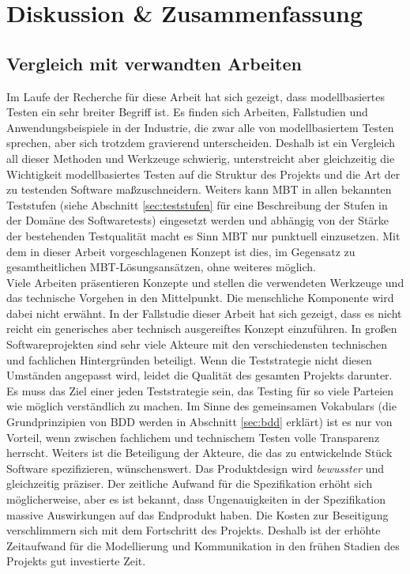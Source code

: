 \makeatletter\ifthesis@masterthesis
\chapter{Diskussion \& Zusammenfassung}
\label{sec:discussion}

\section{Vergleich mit verwandten Arbeiten}
Im Laufe der Recherche für diese Arbeit hat sich gezeigt, dass modellbasiertes Testen ein sehr breiter Begriff ist. Es finden sich Arbeiten, Fallstudien und Anwendungsbeispiele in der Industrie, die zwar alle von modellbasiertem Testen sprechen, aber sich trotzdem gravierend unterscheiden. Deshalb ist ein Vergleich all dieser Methoden und Werkzeuge schwierig, unterstreicht aber gleichzeitig die Wichtigkeit modellbasiertes Testen auf die Struktur des Projekts und die Art der zu testenden Software maßzuschneidern. Weiters kann \Gls{MBT} in allen bekannten Teststufen (siehe Abschnitt \ref{sec:teststufen} für eine Beschreibung der Stufen in der Domäne des Softwaretests) eingesetzt werden und abhängig von der Stärke der bestehenden Testqualität macht es Sinn \Gls{MBT} nur punktuell einzusetzen. Mit dem in dieser Arbeit vorgeschlagenen Konzept ist dies, im Gegensatz zu gesamtheitlichen MBT-Lösungsansätzen, ohne weiteres möglich.\\
Viele Arbeiten \cite{pretschner_one_2005} \cite{pinheiro_model-based_2013} \cite{sensler_testautomatisierung_2011} präsentieren Konzepte und stellen die verwendeten Werkzeuge und das technische Vorgehen in den Mittelpunkt. Die menschliche Komponente wird dabei nicht erwähnt. In der Fallstudie dieser Arbeit hat sich gezeigt, dass es nicht reicht ein generisches aber technisch ausgereiftes Konzept einzuführen. In großen Softwareprojekten sind sehr viele Akteure mit den verschiedensten technischen und fachlichen Hintergründen beteiligt. Wenn die Teststrategie nicht diesen Umständen angepasst wird, leidet die Qualität des gesamten Projekts darunter. Es muss das Ziel einer jeden Teststrategie sein, das Testing für so viele Parteien wie möglich verständlich zu machen. Im Sinne des gemeinsamen Vokabulars (die Grundprinzipien von \Gls{BDD} werden in Abschnitt \ref{sec:bdd} erklärt) ist es nur von Vorteil, wenn zwischen fachlichem und technischem Testen volle Transparenz herrscht. Weiters ist die Beteiligung der Akteure, die das zu entwickelnde Stück Software spezifizieren, wünschenswert. Das Produktdesign wird \textit{bewusster} und gleichzeitig präziser. Der zeitliche Aufwand für die Spezifikation erhöht sich möglicherweise, aber es ist bekannt, dass Ungenauigkeiten in der Spezifikation massive Auswirkungen auf das Endprodukt haben. Die Kosten zur Beseitigung verschlimmern sich mit dem Fortschritt des Projekts. Deshalb ist der erhöhte Zeitaufwand für die Modellierung und Kommunikation in den frühen Stadien des Projekts gut investierte Zeit.\\
